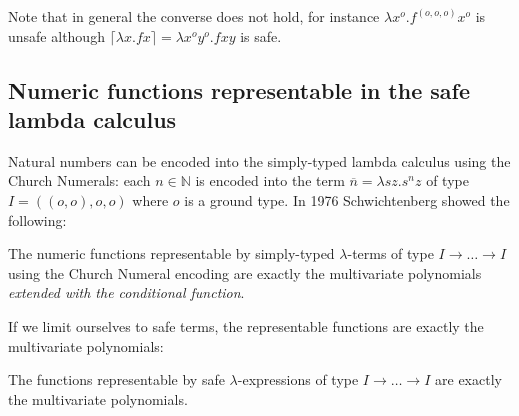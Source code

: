 \documentclass{llncs}
\newcommand{\elnf}[1]{\lceil #1\rceil} %
\newcommand{\encode}[1]{\overline{#1}} \newcommand\dps{\displaystyle}
\newcommand\nat{\mathbb{N}}
\begin{document}
Note that in general the converse does not hold, for instance $\lambda
x^o . f^{(o,o,o)} x^o$ is unsafe although $\elnf{\lambda x . f x} =
\lambda x^o y^o . f x y$ is safe.

\subsection*{Numeric functions representable in the safe lambda calculus}

Natural numbers can be encoded into the simply-typed
lambda calculus using the Church Numerals: each $n\in\nat$ is
encoded into the term $\encode{n} = \lambda s z. s^n z$ of type $I =
((o,o),o,o)$ where $o$ is a ground type. In 1976 Schwichtenberg
\cite{citeulike:622637} showed the following:


\begin{theorem}[Schwichtenberg 1976]
The numeric functions representable by simply-typed $\lambda$-terms of
type $I\rightarrow \ldots \rightarrow I$ using the Church Numeral
encoding are exactly the multivariate polynomials \emph{extended with
the conditional function}.
\end{theorem}

If we limit ourselves to safe terms, the representable functions are
exactly the multivariate polynomials:
\begin{theorem}
\label{thm:polychar}
The functions representable by safe $\lambda$-expressions of type
$I\rightarrow \ldots \rightarrow I$ are exactly the multivariate
polynomials.
\end{theorem}
\end{document}
